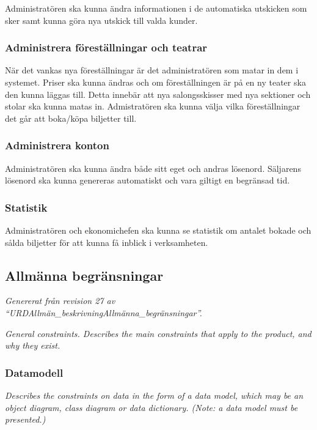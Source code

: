 \documentclass[a4paper, twoside, 11pt, titlepage]{article}
\begin{document}
		Administratören ska kunna ändra informationen i de automatiska utskicken som sker samt kunna göra nya utskick till valda kunder.

	\subsubsection{Administrera föreställningar och teatrar}


		När det vankas nya föreställningar är det administratören som matar in dem i systemet. Priser ska kunna ändras och om föreställningen är på en ny teater ska den kunna läggas till. Detta innebär att nya salongsskisser med nya sektioner och stolar ska kunna matas in. Admistratören ska kunna välja vilka föreställningar det går att boka/köpa biljetter till.

	\subsubsection{Administrera konton}


		Administratören ska kunna ändra både sitt eget och andras lösenord. Säljarens lösenord ska kunna genereras automatiskt och vara giltigt en begränsad tid.

	\subsubsection{Statistik}


		Administratören och ekonomichefen ska kunna se statistik om antalet bokade och sålda biljetter för att kunna få inblick i verksamheten.

	\subsection{Allmänna begränsningar}


	\emph{Genererat från revision 27 av ``URDAllmän\_beskrivningAllmänna\_begränsningar''.}

	\emph{General constraints. Describes the main constraints that apply to the product, and why they exist.}

	\subsubsection{Datamodell}


		\emph{Describes the constraints on data in the form of a data model, which may be an object diagram, class diagram or data dictionary. (Note: a data model must be presented.)}
\end{document}
